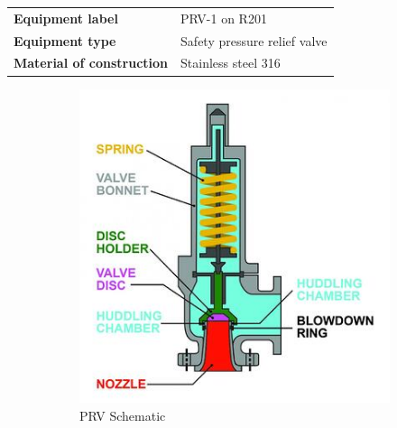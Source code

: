 \begin{table}[H]
    \centering
    \begin{tabular}{@{}l|l@{}}
    \toprule
      \textbf{Equipment label}  & PRV-1 on R201\\
       \textbf{Equipment type}  & Safety pressure relief valve \\
       \textbf{Material of construction} & Stainless steel 316 \\
       \bottomrule
    \end{tabular}
\end{table}


\begin{figure}[H]
    \centering
    \begin{subfigure}{0.49\linewidth}
        \includegraphics[width=\linewidth]{chapters/Z-support/figures/PSV_Diagram.jpg}
        \caption{PRV Schematic \cite{smith_spring_nodate}}
    \end{subfigure}
    \begin{subfigure}{0.49\linewidth}

\end{subfigure}
\end{figure}
